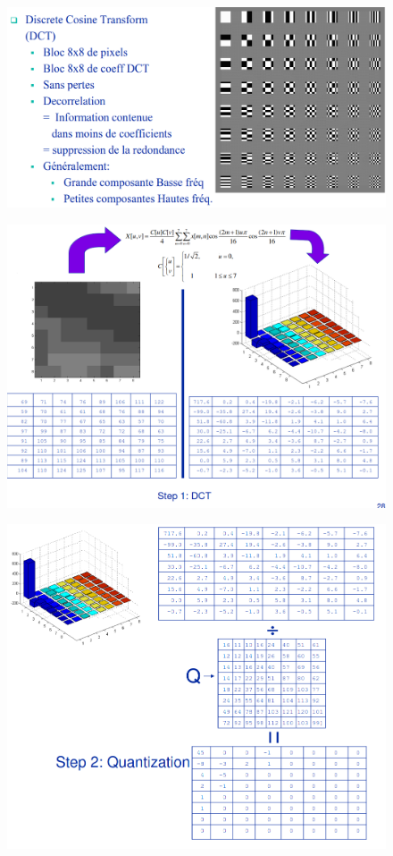 \documentclass[12pt]{article}
\begin{document}
			\begin{figure}[H]
				\centering
				\includegraphics[width=\textwidth]{img/Compression/DCT.png}

			\end{figure}
			\begin{figure}[H]
				\centering
				\includegraphics[width=\textwidth]{img/Compression/DCT1.png}

			\end{figure}
			\begin{figure}[H]
				\centering
				\includegraphics[width=\textwidth]{img/Compression/DCT2.png}

			\end{figure}
\end{document}
